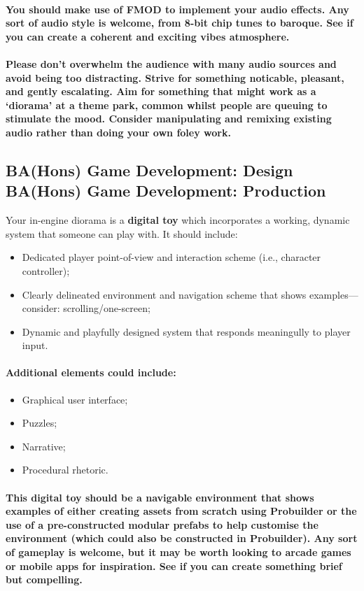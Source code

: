 \documentclass{../../fal_assignment}
\begin{document}
\paragraph{You should make use of FMOD to implement your audio effects. Any sort of audio style is welcome, from 8-bit chip tunes to baroque. See if you can create a coherent and exciting vibes atmosphere.}

\paragraph{Please don’t overwhelm the audience with many audio sources and avoid being too distracting. Strive for something noticable, pleasant, and gently escalating. Aim for something that might work as a ‘diorama’ at a theme park, common whilst people are queuing to stimulate the mood. Consider manipulating and remixing existing audio rather than doing your own foley work.}

\subsection*{BA(Hons) Game Development: Design \\ BA(Hons) Game Development: Production}

Your in-engine diorama is a \textbf{digital toy} which incorporates a working, dynamic system that someone can play with. It should include:
\begin{itemize}
\item Dedicated player point-of-view and interaction scheme (i.e., character controller);
\item Clearly delineated environment and navigation scheme that shows examples---consider: scrolling/one-screen; 
\item Dynamic and playfully designed system that responds meaningully to player input.
\end{itemize}
\paragraph{Additional elements could include:}
\begin{itemize}
\item Graphical user interface;
\item Puzzles;
\item Narrative; 
\item Procedural rhetoric.
\end{itemize}
\paragraph{This digital toy should be a navigable environment that shows examples of either creating assets from scratch using Probuilder or the use of a pre-constructed modular prefabs to help customise the environment (which could also be constructed in Probuilder). Any sort of gameplay is welcome, but it may be worth looking to arcade games or mobile apps for inspiration. See if you can create something brief but compelling.}
\end{document}
